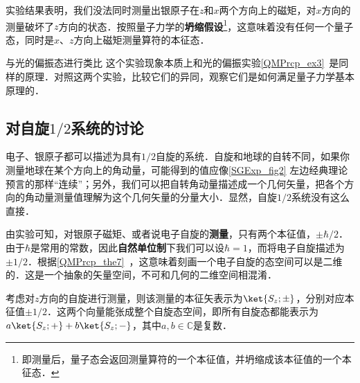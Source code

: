 实验结果表明，我们没法同时测量出银原子在$z$和$x$两个方向上的磁矩，对$x$方向的测量破坏了$z$方向的状态．按照量子力学的\textbf{坍缩假设}\footnote{即测量后，量子态会返回测量算符的一个本征值，并坍缩成该本征值的一个本征态．}，这意味着没有任何一个量子态，同时是$x$、$z$方向上磁矩测量算符的本征态．



\begin{exercise}{与光的偏振态进行类比}
这个实验现象本质上和光的偏振实验\autoref{QMPrcp_ex3}~是同样的原理．对照这两个实验，比较它们的异同，观察它们是如何满足量子力学基本原理的．
\end{exercise}





\subsection{对自旋$1/2$系统的讨论}

电子、银原子都可以描述为具有$1/2$自旋的系统．自旋和地球的自转不同，如果你测量地球在某个方向上的角动量，可能得到的值应像\autoref{SGExp_fig2} 左边经典理论预言的那样“连续”；另外，我们可以把自转角动量描述成一个几何矢量，把各个方向的角动量测量值理解为这个几何矢量的分量大小．显然，自旋$1/2$系统没有这么直接．

由实验可知，对银原子磁矩、或者说电子自旋的\textbf{测量}，只有两个本征值，$\pm\hbar/2$．由于$\hbar$是常用的常数，因此\textbf{自然单位制}下我们可以设$\hbar=1$，而将电子自旋描述为$\pm 1/2$．根据\autoref{QMPrcp_the7}~，这意味着刻画一个电子自旋的态空间可以是二维的．这是一个抽象的矢量空间，不可和几何的二维空间相混淆．

考虑对$z$方向的自旋进行测量，则该测量的本征矢表示为$\ket{S_z; \pm}$，分别对应本征值$\pm 1/2$．这两个向量能张成整个自旋态空间，即所有自旋态都能表示为$a\ket{S_z; +}+b\ket{S_z; -}$，其中$a, b\in\mathbb{C}$是复数．





























